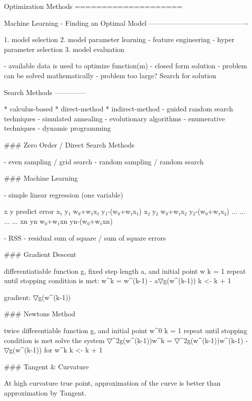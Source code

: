 Optimization Methods
====================

Machine Learning - Finding an Optimal Model
-------------------------------------------

1. model selection
2. model parameter learning
  - feature engineering
  - hyper parameter selection
3. model evaluation

- available data is used to optimize function(m)
- closed form solution - problem can be solved mathematically
- problem too large? Search for solution

Search Methods
--------------

* calculus-based
  * direct-method
  * indirect-method
- guided random search techniques
  - simulated annealing
  - evolutionary algorithms
- enumerative techniques
  - dynamic programming

### Zero Order / Direct Search Methods

- even sampling / grid search
- random sampling / random search

### Machine Learning

- simple linear regression (one variable)

    x    y    predict  error
    x₁   y₁   w₀+w₁x₁  y₁-(w₀+w₁x₁)
    x₂   y₂   w₀+w₁x₂  y₂-(w₀+w₁x₂)
    ...  ...  ...      ...
    xn   yn   w₀+w₁xn  yn-(w₀+w₁xn)

- RSS - residual sum of square / sum of square errors

### Gradient Descent

    differentiatiable function g, fixed step length a, and initial point w
    k = 1
    repeat until stopping condition is met:
        w^k = w^(k-1) - a▽g(w^(k-1))
        k <- k + 1

    gradient: ▽g(w^(k-1))

### Newtons Method

    twice differentiable function g, and initial point w^0
    k = 1
    repeat until stopping condition is met
        solve the system ▽^2g(w^(k-1))w^k = ▽^2g(w^(k-1))w^(k-1) - ▽g(w^(k-1)) for w^k
        k <- k + 1

### Tangent & Curvature

At high curvature true point, approximation of the curve is better than
approximation by Tangent.
